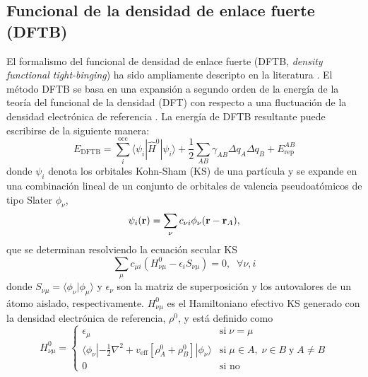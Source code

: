 \subsection{Funcional de la densidad de enlace fuerte (DFTB)}\label{s:dftb}

El formalismo del funcional de densidad de enlace fuerte (DFTB, \textit{density
functional tight-binging}) ha sido ampliamente descripto en la literatura 
\cite{elstner1998,frauenheim2000,seifert2007,gaus2011}. El método DFTB se basa 
en una expansión a segundo orden de la energía de la teoría del funcional de la 
densidad (DFT) con respecto a una fluctuación de la densidad electrónica de 
referencia \cite{foulkes1989}. La energía de DFTB resultante puede escribirse de 
la siguiente manera:
\begin{equation}\label{eq:dftb}
    E_{\text{DFTB}}=\sum_i^{\text{occ}}\langle\psi_i|\hat{H}^0|\psi_i\rangle+\frac{1}{2}\sum_{AB}\gamma_{AB}\Delta q_A\Delta q_B+E_{\text{rep}}^{AB}
\end{equation}
donde $\psi_i$ denota los orbitales Kohn-Sham (KS) de una partícula
y se expande en una combinación lineal de un conjunto de orbitales de valencia pseudoatómicos de tipo Slater $\phi_\nu$,
\begin{equation}
    \psi_i({\bf r})=\sum_\nu c_{\nu i}\phi_\nu({\bf r}-{\bf r}_A),
\end{equation}
que se determinan resolviendo la ecuación secular KS
\begin{equation}\label{eq:ks}
    \sum_\mu c_{\mu i}\left(H^0_{\nu\mu}-\epsilon_iS_{\nu\mu}\right)=0, \;\;\forall \nu,i
\end{equation}
donde $S_{\nu\mu}=\langle \phi_\nu| \phi_\mu\rangle$ y $\epsilon_\nu$ son la 
matriz de superposición y los autovalores de un átomo aislado, respectivamente.
${H}^0_{\nu\mu}$ es el Hamiltoniano efectivo KS generado con la densidad 
electrónica de referencia, $\rho^0$, y está definido como
\begin{equation}\label{eq:h0}
    H^0_{\nu\mu}=\begin{cases}
        \epsilon_\mu & \text{si}\; \nu=\mu\\
        \langle \phi_{\nu}| -\frac{1}{2}\nabla^2+v_{\text{eff}}\left[\rho_A^0+\rho_B^0\right]|\phi_{\nu}\rangle&\text{si}\;\mu\in A,\; \nu\in B\;\text{y} \;A\ne B\\
        0& \text{si no}
    \end{cases}
\end{equation}
